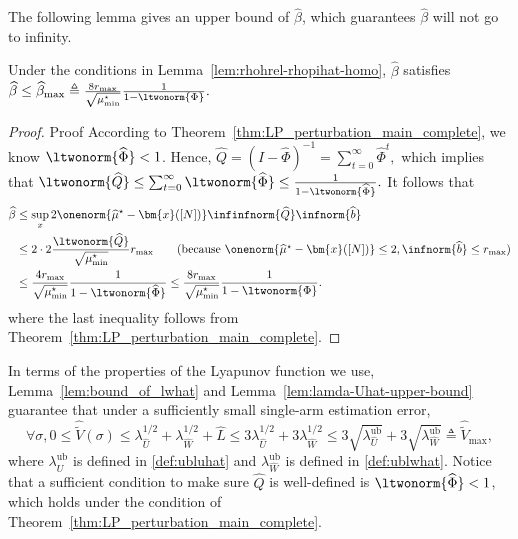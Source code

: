 \documentclass[mnsc,nonblindrev]{informs3}
\newcommand{\lwhhalf}{\lambda_{\widehat{W}}^{1/2}}
\newcommand{\ublwhat}{\lambda^{\mathrm{ub}}_{\widehat{W}}}
\newcommand{\ubluhat}{\lambda^{\mathrm{ub}}_{\widehat{U}}}
\newcommand{\bmx}{\bm{x}}
\newcommand{\phihat}{\widehat{\Phi}}
\newcommand{\muhst}{\widehat{\mu}^\star}
\begin{document}
\begin{APPENDICES}
The following lemma gives an upper bound of $\widehat\beta$, which guarantees $\widehat\beta$ will not go to infinity.
\begin{lemma}\label{lem:betahat-upperbound}
Under the conditions in Lemma~\ref{lem:rhohrel-rhopihat-homo},
    $\widehat \beta$ satisfies 
    $
        \widehat{\beta}\le \widehat{\beta}_{\max}\triangleq  \frac{8r_{\max}}{\sqrt{\mu^\star_{\min}}}\frac{1}{1-\ltwonorm{\Phi}}.
    $
\end{lemma}

\begin{proof}{Proof}
    According to Theorem~\ref{thm:LP_perturbation_main_complete}, we know $\ltwonorm{\phihat}<1$. Hence,
    $
        \widehat Q = (I-\phihat)^{-1}=\sum_{t=0}^\infty\phihat^t,
    $
    which implies that
    $
        \ltwonorm{\widehat Q}\le    \sum_{t=0}^\infty\ltwonorm{\phihat}\le\frac{1}{1-\ltwonorm{\phihat}}.
    $
    It follows that 
    \begin{align*}
        \widehat \beta&\le \sup_x 2\onenorm{\muhst-\bmx([N])}\infinfnorm{\widehat Q}\infnorm{\widehat b}\\
        & \le 2\cdot 2\frac{\ltwonorm{\widehat Q}}{\sqrt{\mu^\star_{\min}}}r_{\max} \tag{because $\onenorm{\muhst-\bmx([N])}\le 2, \infnorm{\widehat{b}}\le r_{\max}$} \\
        &\le \frac{4r_{\max}}{\sqrt{\mu^\star_{\min}}}\frac{1}{1-\ltwonorm{\phihat}} 
         \le \frac{8r_{\max}}{\sqrt{\mu^\star_{\min}}}\frac{1}{1-\ltwonorm{\Phi}}.
    \end{align*}
    where the last inequality follows from Theorem~\ref{thm:LP_perturbation_main_complete}.
\end{proof}

In terms of the properties of the Lyapunov function we use, Lemma~\ref{lem:bound_of_lwhat} and Lemma~\ref{lem:lamda-Uhat-upper-bound} guarantee that under a sufficiently small single-arm estimation error,
\begin{equation}\label{def:hat-tilde-V-max}
    \forall \sigma, 0\le \widehat{\tilde V}(\sigma)\le \lambda_{\widehat U}^{1/2}+\lwhhalf+\widehat L\le3\lambda_{\widehat U}^{1/2}+3\lwhhalf\le3\sqrt{\ubluhat}+3\sqrt{\ublwhat}\triangleq \widehat{\tilde V}_{\max},
\end{equation}
where $\ubluhat$ is defined in \eqref{def:ubluhat} and $\ublwhat$ is defined in \eqref{def:ublwhat}.
Notice that a sufficient condition to make sure $\widehat Q$ is well-defined is $\ltwonorm{\phihat}<1$, which holds under the condition of   Theorem~\ref{thm:LP_perturbation_main_complete}. 


\end{APPENDICES}
\end{document}
